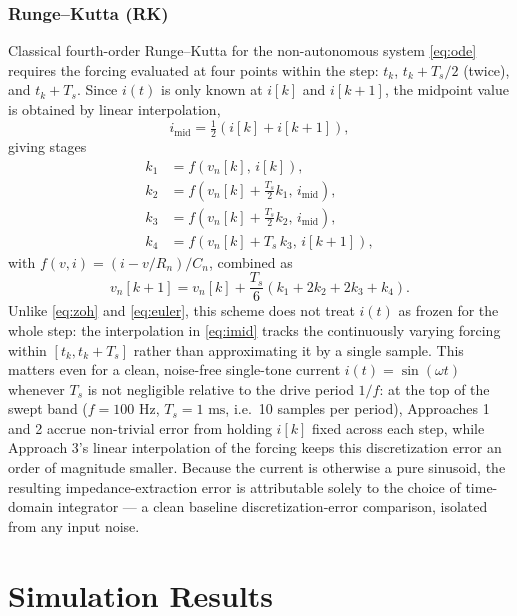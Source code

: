 \documentclass[conference]{IEEEtran}
\begin{document}
	\subsubsection{Runge–Kutta (RK)}
	Classical fourth-order Runge--Kutta for the non-autonomous system \eqref{eq:ode} requires the forcing evaluated at four points within the step: $t_k$, $t_k+T_s/2$ (twice), and $t_k+T_s$. Since $i(t)$ is only known at $i[k]$ and $i[k+1]$, the midpoint value is obtained by linear interpolation,
	\begin{equation}
		i_{\mathrm{mid}} = \tfrac{1}{2}\left(i[k]+i[k+1]\right),
		\label{eq:imid}
	\end{equation}
	giving stages
	\begin{align}
		k_1 &= f\!\left(v_n[k],\, i[k]\right), \\
		k_2 &= f\!\left(v_n[k] + \tfrac{T_s}{2}k_1,\, i_{\mathrm{mid}}\right), \\
		k_3 &= f\!\left(v_n[k] + \tfrac{T_s}{2}k_2,\, i_{\mathrm{mid}}\right), \\
		k_4 &= f\!\left(v_n[k] + T_s\,k_3,\, i[k+1]\right),
	\end{align}
	with $f(v,i) = (i-v/R_n)/C_n$, combined as
	\begin{equation}
		v_n[k+1] = v_n[k] + \frac{T_s}{6}\left(k_1+2k_2+2k_3+k_4\right).
		\label{eq:rk4}
	\end{equation}
	Unlike \eqref{eq:zoh} and \eqref{eq:euler}, this scheme does not treat $i(t)$ as frozen for the whole step: the interpolation in \eqref{eq:imid} tracks the continuously varying forcing within $[t_k,t_k+T_s]$ rather than approximating it by a single sample. This matters even for a clean, noise-free single-tone current $i(t)=\sin(\omega t)$ whenever $T_s$ is not negligible relative to the drive period $1/f$: at the top of the swept band ($f=100\text{ Hz}$, $T_s=1\text{ ms}$, i.e.\ 10 samples per period), Approaches 1 and 2 accrue non-trivial error from holding $i[k]$ fixed across each step, while Approach 3's linear interpolation of the forcing keeps this discretization error an order of magnitude smaller. Because the current is otherwise a pure sinusoid, the resulting impedance-extraction error is attributable solely to the choice of time-domain integrator — a clean baseline discretization-error comparison, isolated from any input noise.


	\cleardoublepage
	\section{Simulation Results}
\end{document}
